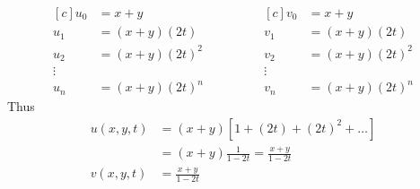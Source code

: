 \documentclass[]{article}
\begin{document}


\begin{equation*}
\begin{aligned}[c]
    u_0 &=  x+y
    \\
    u_1 &= (x+y)(2t)
    \\
    u_2 &= (x+y)(2t)^2
    \\
    \vdots
    \\
    u_n &= (x+y)(2t)^n
\end{aligned}
\qquad\qquad
\begin{aligned}[c]
    v_0 &=  x+y
    \\
    v_1 &= (x+y)(2t)
    \\
    v_2 &= (x+y)(2t)^2
    \\
    \vdots
    \\
    v_n &= (x+y)(2t)^n
\end{aligned}
\end{equation*}
Thus
\begin{align*}
    u(x,y,t) &=(x+y)\left[ 1+(2t) + (2t)^2 + \dots \right] \\
    &=(x+y)\frac{1}{1-2t} = \frac{x+y}{1-2t}\\
    v(x,y,t)&=\frac{x+y}{1-2t}\\
\end{align*}
\end{document}
